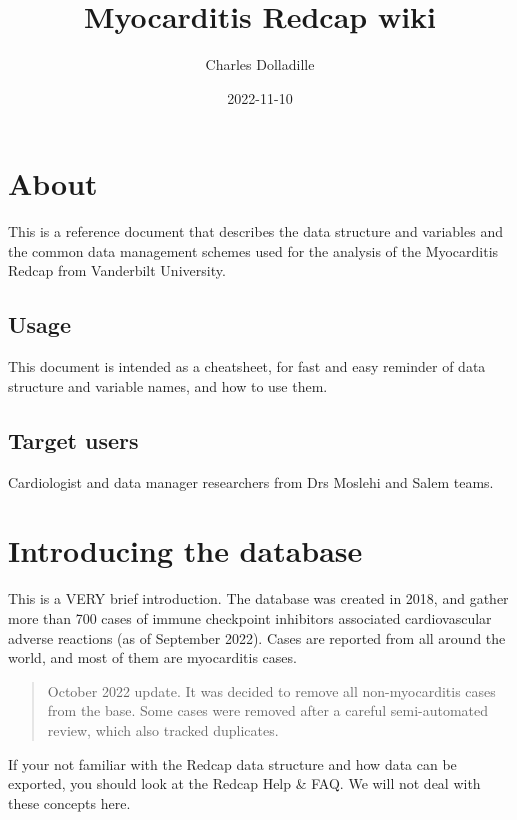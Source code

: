 \documentclass[
]{book}
\title{Myocarditis Redcap wiki}
\author{Charles Dolladille}
\date{2022-11-10}
\begin{document}
\maketitle

{
\setcounter{tocdepth}{1}
\tableofcontents
}
\hypertarget{about}{%
\chapter{About}\label{about}}

This is a reference document that describes the data structure and variables and the common data management schemes used for the analysis of the Myocarditis Redcap from Vanderbilt University.

\hypertarget{usage}{%
\section{Usage}\label{usage}}

This document is intended as a cheatsheet, for fast and easy reminder of data structure and variable names, and how to use them.

\hypertarget{target-users}{%
\section{Target users}\label{target-users}}

Cardiologist and data manager researchers from Drs Moslehi and Salem teams.

\hypertarget{intro}{%
\chapter{Introducing the database}\label{intro}}

This is a VERY brief introduction. The database was created in 2018, and gather more than 700 cases of immune checkpoint inhibitors associated cardiovascular adverse reactions (as of September 2022). Cases are reported from all around the world, and most of them are myocarditis cases.

\begin{quote}
October 2022 update. It was decided to remove all non-myocarditis cases from the base. Some cases were removed after a careful semi-automated review, which also tracked duplicates.
\end{quote}

If your not familiar with the Redcap data structure and how data can be exported, you should look at the Redcap Help \& FAQ. We will not deal with these concepts here.
\end{document}
